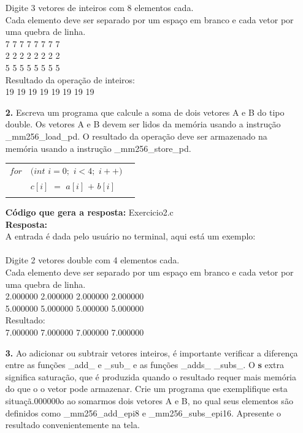\documentclass[oneside,a4paper,12pt]{article}
\renewcommand{\b}{\textbf}
\begin{document}
\begin{enumerate}
        Digite 3 vetores de inteiros com 8 elementos cada.\\
        Cada elemento deve ser separado por um espaço em branco e cada vetor por uma quebra de linha.\\
        7 7 7 7 7 7 7 7\\
        2 2 2 2 2 2 2 2\\
        5 5 5 5 5 5 5 5\\
        Resultado da operação de inteiros:\\
        19 19 19 19 19 19 19 19\\
    
    \item[\b{2.}] Escreva um programa que calcule a soma de dois vetores A e B do tipo double. Os vetores A e B devem ser lidos da memória usando a instrução \_mm256\_load\_pd. O resultado da operação deve ser armazenado na memória usando a instrução \_mm256\_store\_pd.
    
    \begin{center}
    \begin{tabular}{clc}
    $for$ & $(int$ $i = 0;$ $i < 4;$ $i++)$ &  \\
        & $c[i]$ $=$ $a[i]$ $+$ $b[i]$   &  \\
        &                                & 
    \end{tabular}
    \end{center}
    
    \b{Código que gera a resposta:} Exercicio2.c\\
    \b{Resposta:}\\
    A entrada é dada pelo usuário no terminal, aqui está um exemplo:\\
    \\
    Digite 2 vetores double com 4 elementos cada.\\
    Cada elemento deve ser separado por um espaço em branco e cada vetor por uma quebra de linha.\\
    2.000000 2.000000 2.000000 2.000000\\
    5.000000 5.000000 5.000000 5.000000\\
    Resultado:\\
    7.000000 7.000000 7.000000 7.000000\\
    
    \item[\b{3.}] Ao adicionar ou subtrair vetores inteiros, é importante verificar a diferença entre as funções \_add\_ e \_sub\_ e as funções \_adds\_ \_subs\_. O \b{s} extra significa saturação, que é produzida quando o resultado requer mais memória do que o o vetor pode armazenar. Crie um programa que exemplifique esta situaçã.000000o ao somarmos dois vetores A e B, no qual seus elementos são definidos como \_mm256\_add\_epi8 e \_mm256\_subs\_epi16. Apresente o resultado convenientemente na tela.\\
    

\end{enumerate}
\end{document}
